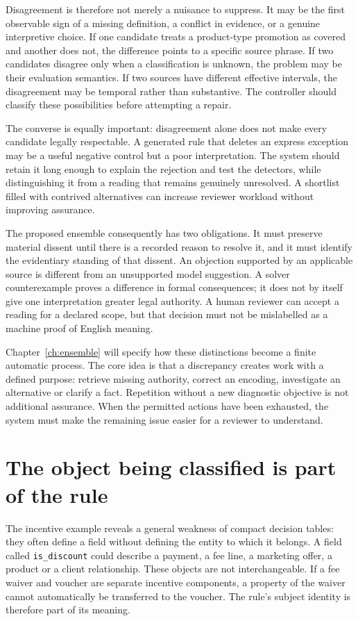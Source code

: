 \documentclass[12pt,a4paper,oneside,openany]{book}
\begin{document}
Disagreement is therefore not merely a nuisance to suppress. It may be the first
observable sign of a missing definition, a conflict in evidence, or a genuine
interpretive choice. If one candidate treats a product-type promotion as covered
and another does not, the difference points to a specific source phrase. If two
candidates disagree only when a classification is unknown, the problem may be
their evaluation semantics. If two sources have different effective intervals,
the disagreement may be temporal rather than substantive. The controller should
classify these possibilities before attempting a repair.

The converse is equally important: disagreement alone does not make every
candidate legally respectable. A generated rule that deletes an express exception
may be a useful negative control but a poor interpretation. The system should
retain it long enough to explain the rejection and test the detectors, while
distinguishing it from a reading that remains genuinely unresolved. A shortlist
filled with contrived alternatives can increase reviewer workload without
improving assurance.

The proposed ensemble consequently has two obligations. It must preserve
material dissent until there is a recorded reason to resolve it, and it must
identify the evidentiary standing of that dissent. An objection supported by an
applicable source is different from an unsupported model suggestion. A solver
counterexample proves a difference in formal consequences; it does not by itself
give one interpretation greater legal authority. A human reviewer can accept a
reading for a declared scope, but that decision must not be mislabelled as a
machine proof of English meaning.

Chapter~\ref{ch:ensemble} will specify how these distinctions become a finite
automatic process. The core idea is that a discrepancy creates work with a
defined purpose: retrieve missing authority, correct an encoding, investigate an
alternative or clarify a fact. Repetition without a new diagnostic objective is
not additional assurance. When the permitted actions have been exhausted, the
system must make the remaining issue easier for a reviewer to understand.

\section{The object being classified is part of the rule}
\label{sec:problem-objects}
The incentive example reveals a general weakness of compact decision tables:
they often define a field without defining the entity to which it belongs. A
field called \texttt{is\_discount} could describe a payment, a fee line, a
marketing offer, a product or a client relationship. These objects are not
interchangeable. If a fee waiver and voucher are separate incentive components,
a property of the waiver cannot automatically be transferred to the voucher.
The rule's subject identity is therefore part of its meaning.
\end{document}
